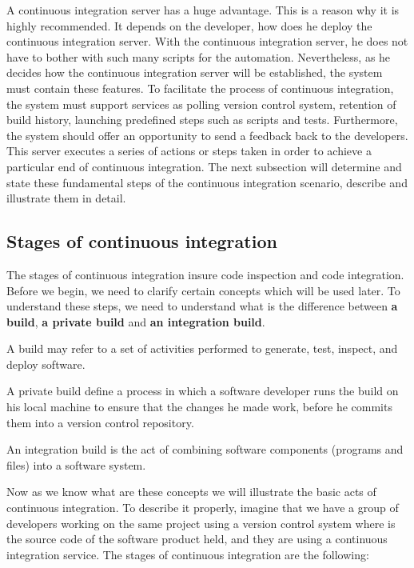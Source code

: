 A continuous integration server has a huge advantage. This is a reason why it is highly recommended. It depends on the developer, how does he deploy the continuous integration server. With the continuous integration server, he does not have to bother with such many scripts for the automation. Nevertheless, as he decides how the continuous integration server will be established, the system must contain these features. To facilitate the process of continuous integration, the system must support services as polling version control system, retention of build history, launching predefined steps such as scripts and tests. Furthermore, the system should offer an opportunity to send a feedback back to the developers. This server executes a series of actions or steps taken in order to achieve a particular end of continuous integration. The next subsection will determine and state these fundamental steps of the continuous integration scenario, describe and illustrate them in detail.

\subsection{Stages of continuous integration}

The stages of continuous integration insure code inspection and code integration. Before we begin, we need to clarify certain concepts which will be used later. To understand these steps, we need to understand what is the difference between \textbf{a build}, \textbf{a private build} and \textbf{an integration build}.

\begin{DEF}
A build may refer to a set of activities performed to generate, test, inspect, and deploy software\cite{CIPD}.
\end{DEF}

\begin{DEF}
A private build define a process in which a software developer runs the build on his local machine to ensure that the changes he made work, before he commits them into a version control repository.
\end{DEF}

\begin{DEF}
An integration build is the act of combining software components (programs and files) into a software system\cite{CIPD}.
\end{DEF}

Now as we know what are these concepts we will illustrate the basic acts of continuous integration. To describe it properly, imagine that we have a group of developers working on the same project using a version control system where is the source code of the software product held, and they are using a continuous integration service. The stages of continuous integration are the following:

